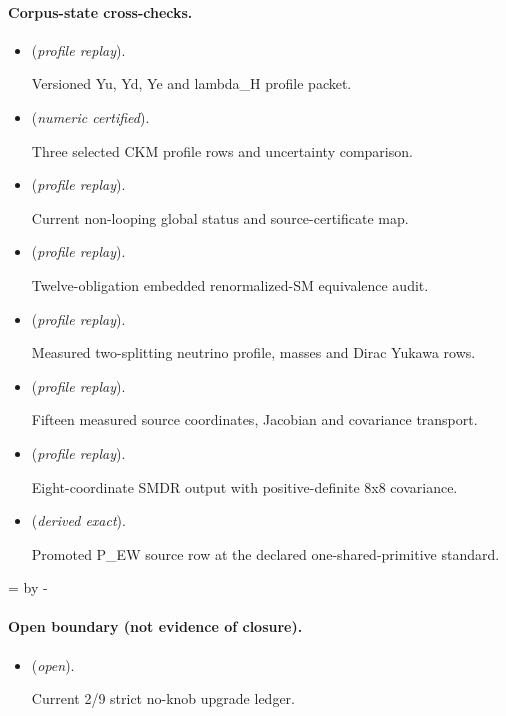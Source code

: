 \documentclass[11pt]{article}
\begin{document}
\paragraph{Corpus-state cross-checks.}
\begin{itemize}
\setlength{\itemsep}{0.25em}
\item {} (\emph{profile replay}).\par Versioned Yu, Yd, Ye and lambda\_H profile packet.
\item {} (\emph{numeric certified}).\par Three selected CKM profile rows and uncertainty comparison.
\item {} (\emph{profile replay}).\par Current non-looping global status and source-certificate map.
\item {} (\emph{profile replay}).\par Twelve-obligation embedded renormalized-SM equivalence audit.
\item {} (\emph{profile replay}).\par Measured two-splitting neutrino profile, masses and Dirac Yukawa rows.
\item {} (\emph{profile replay}).\par Fifteen measured source coordinates, Jacobian and covariance transport.
\item {} (\emph{profile replay}).\par Eight-coordinate SMDR output with positive-definite 8x8 covariance.
\item {} (\emph{derived exact}).\par Promoted P\_EW source row at the declared one-shared-primitive standard.
\end{itemize}

\par\begingroup{}=\pagegoal\advance{} by -\pagetotal\ifdim\dimen0<7\baselineskip\newpage\fi\endgroup
\paragraph{Open boundary (not evidence of closure).}
\begin{itemize}
\setlength{\itemsep}{0.25em}
\item {} (\emph{open}).\par Current 2/9 strict no-knob upgrade ledger.
\end{itemize}
\end{document}
